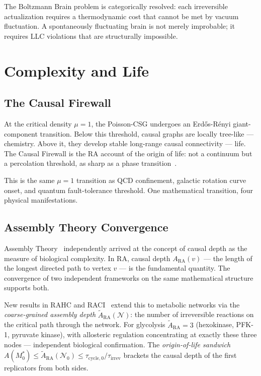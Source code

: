 \documentclass[11pt,a4paper]{article}
\begin{document}
The Boltzmann Brain problem is categorically resolved: each irreversible
actualization requires a thermodynamic cost that cannot be met by vacuum
fluctuation. A spontaneously fluctuating brain is not merely improbable;
it requires LLC violations that are structurally impossible.

\section{Complexity and Life}
\label{sec:complexity}

\subsection{The Causal Firewall}

At the critical density $\mu = 1$, the Poisson-CSG undergoes an
Erd\H{o}s-R\'{e}nyi giant-component transition. Below this threshold,
causal graphs are locally tree-like --- chemistry. Above it, they develop
stable long-range causal connectivity --- life. The Causal Firewall is
the RA account of the origin of life: not a continuum but a percolation
threshold, as sharp as a phase transition~\citep{Sandeman2026RACI}.

This is the same $\mu = 1$ transition as QCD confinement, galactic
rotation curve onset, and quantum fault-tolerance threshold. One
mathematical transition, four physical manifestations.

\subsection{Assembly Theory Convergence}

Assembly Theory~\citep{Walker2023} independently arrived at
the concept of causal depth as the measure of biological complexity.
In RA, causal depth $A_{\mathrm{RA}}(v)$ --- the length of the longest
directed path to vertex $v$ --- is the fundamental quantity. The
convergence of two independent frameworks on the same mathematical
structure supports both.


New results in RAHC and RACI~\citep{Sandeman2026RAHC,Sandeman2026RACI}
extend this to metabolic networks via the \emph{coarse-grained assembly
depth} $\tilde{A}_{\mathrm{RA}}(\mathcal{N})$: the number of irreversible
reactions on the critical path through the network. For glycolysis
$\tilde{A}_{\mathrm{RA}} = 3$ (hexokinase, PFK-1, pyruvate kinase),
with allosteric regulation concentrating at exactly these three nodes ---
independent biological confirmation. The \emph{origin-of-life sandwich}
$A(M^*_0) \leq \tilde{A}_{\mathrm{RA}}(\mathcal{N}_0) \leq
\tau_{\mathrm{cycle},0}/\tau_{\mathrm{irrev}}$
brackets the causal depth of the first replicators from both sides.
\end{document}
